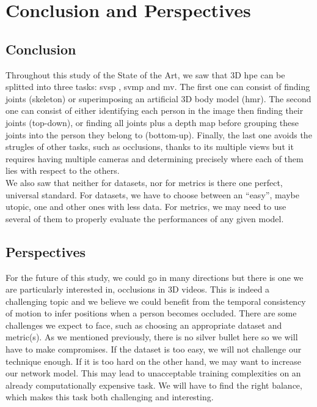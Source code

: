 \documentclass[runningheads]{llncs}
\begin{document}
\section{Conclusion and Perspectives}
\subsection{Conclusion}
Throughout this study of the State of the Art, we saw that 3D \ac{hpe} can be splitted into three tasks: \ac{svsp} , \ac{svmp} and \ac{mv}. The first one can consist of finding joints (skeleton) or superimposing an artificial 3D body model (\ac{hmr}). The second one can consist of either identifying each person in the image then finding their joints (top-down), or finding all joints plus a depth map before grouping these joints into the person they belong to (bottom-up). Finally, the last one avoids the strugles of other tasks, such as occlusions, thanks to its multiple views but it requires having multiple cameras and determining precisely where each of them lies with respect to the others. \\
We also saw that neither for datasets, nor for metrics is there one perfect, universal standard. For datasets, we have to choose between an ``easy'', maybe utopic, one and other ones with less data. For metrics, we may need to use several of them to properly evaluate the performances of any given model.


\subsection{Perspectives}
For the future of this study, we could go in many directions but there is one we are particularly interested in, occlusions in 3D videos. This is indeed a challenging topic and we believe we could benefit from the temporal consistency of motion to infer positions when a person becomes occluded. There are some challenges we expect to face, such as choosing an appropriate dataset and metric(s). As we mentioned previously, there is no silver bullet here so we will have to make compromises. If the dataset is too easy, we will not challenge our technique enough. If it is too hard on the other hand, we may want to increase our network model. This may lead to unacceptable training complexities on an already computationally expensive task. We will have to find the right balance, which makes this task both challenging and interesting.
\end{document}
